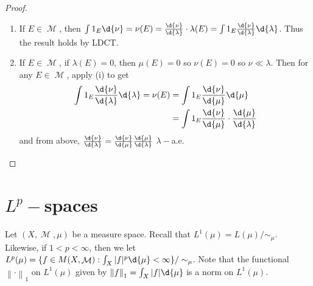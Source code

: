 \documentclass[11pt, a4paper]{memoir}
\newcommand{\norm}[1]{\ensuremath{\left\lVert#1\right\rVert}}
\theoremstyle{change}
\theoremstyle{plain}
\theoremstyle{nonumberplain}
\newtheorem{proof}{Proof}
\DeclareMathOperator{\M}{{\mathcal{M}}}
\begin{document}
\begin{proof}
    \begin{enumerate}[label=(roman*)]
        \item If $E\in\M$, then $\int 1_E\d{\nu}=\nu(E)=\frac{\d{\nu}}{\d{\lambda}}\cdot\lambda(E)=\int 1_E\frac{\d{\nu}}{\d{\lambda}}\d{\lambda}$.
            Thus the result holds by LDCT.
        \item If $E\in\M$, if $\lambda(E)=0$, then $\mu(E)=0$ so $\nu(E)=0$ so $\nu\ll\lambda$.
            Then for any $E\in\M$, apply (i) to get
            \begin{align*}
                \int 1_E\frac{\d{\nu}}{\d{\lambda}}\d{\lambda} = \nu(E) &= \int 1_E\frac{\d{\nu}}{\d{\mu}}\d{\mu}\\
                                                                        &= \int 1_E\frac{\d{\nu}}{\d{\mu}}\cdot\frac{\d{\mu}}{\d{\lambda}}
            \end{align*}
            and from above, $\frac{\d{\nu}}{\d{\lambda}}=\frac{\d{\nu}}{\d{\mu}}\frac{\d{\mu}}{\d{\lambda}}$ $\lambda-$a.e.
    \end{enumerate}
\end{proof}
\section{\texorpdfstring{$L^p-$}{Lp-}spaces}
Let $(X,\M,\mu)$ be a measure space.
Recall that $L^1(\mu)=L(\mu)/\sim_\mu$.
Likewise, if $1<p<\infty$, then we let $L^p(\mu)=\{f\in M(X,\M):\int_X|f|^p\d{\mu}<\infty\}/\sim_\mu$.
Note that the functional $\norm{\cdot}_1$ on $L^1(\mu)$ given by $\norm{f}_1=\int_X|f|\d{\mu}$ is a norm on $L^1(\mu)$.
\end{document}
